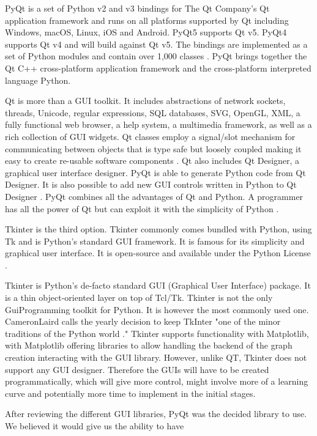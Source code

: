 	PyQt is a set of Python v2 and v3 bindings for The Qt Company's Qt application framework and runs on all platforms supported by Qt including Windows, macOS, Linux, iOS and Android. PyQt5 supports Qt v5. PyQt4 supports Qt v4 and will build against Qt v5. The bindings are implemented as a set of Python modules and contain over 1,000 classes \cite{pyqt_rbc}. PyQt brings together the Qt C++ cross-platform application framework and the cross-platform interpreted language Python.
	
	Qt is more than a GUI toolkit. It includes abstractions of network sockets, threads, Unicode, regular expressions, SQL databases, SVG, OpenGL, XML, a fully functional web browser, a help system, a multimedia framework, as well as a rich collection of GUI widgets. Qt classes employ a signal/slot mechanism for communicating between objects that is type safe but loosely coupled making it easy to create re-usable software components \cite{pyqt_rbc}. Qt also includes Qt Designer, a graphical user interface designer. PyQt is able to generate Python code from Qt Designer. It is also possible to add new GUI controls written in Python to Qt Designer \cite{pyqt_rbc}. PyQt combines all the advantages of Qt and Python. A programmer has all the power of Qt but can exploit it with the simplicity of Python \cite{pyqt_rbc}.
	
	Tkinter is the third option. Tkinter commonly comes bundled with Python, using Tk and is Python's standard GUI framework. It is famous for its simplicity and graphical user interface. It is open-source and available under the Python License \cite{data_camp_gui}.
	
	Tkinter is Python's de-facto standard GUI (Graphical User Interface) package. It is a thin object-oriented layer on top of Tcl/Tk. Tkinter is not the only GuiProgramming toolkit for Python. It is however the most commonly used one. CameronLaird calls the yearly decision to keep TkInter "one of the minor traditions of the Python world \cite{py_tkinter}." Tkinter supports functionality with Matplotlib, with Matplotlib offering libraries to allow handling the backend of the graph creation interacting with the GUI library. However, unlike QT, Tkinter does not support any GUI designer. Therefore the GUIs will have to be created programmatically, which will give more control, might involve more of a learning curve and potentially more time to implement in the initial stages.
	
	After reviewing the different GUI libraries, PyQt was the decided library to use. We believed it would give us the ability to have 
	
